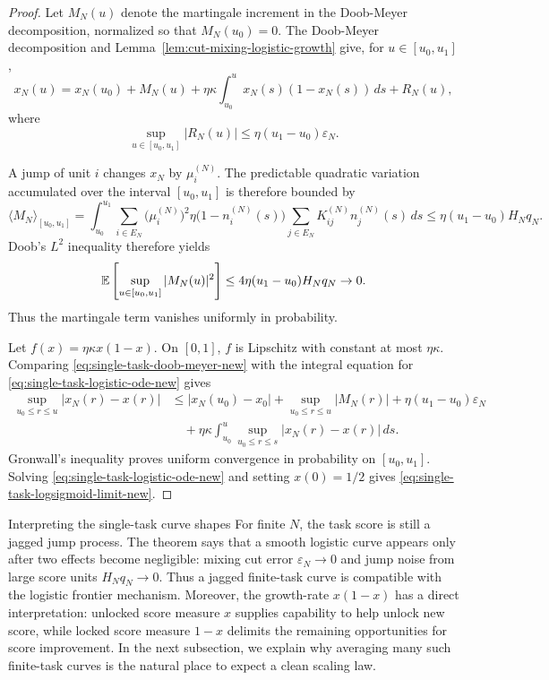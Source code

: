 \begin{proof}
Let $M_N(u)$ denote the martingale increment in the Doob-Meyer decomposition, normalized so that $M_N(u_0)=0$. The Doob-Meyer decomposition and Lemma~\ref{lem:cut-mixing-logistic-growth} give, for $u\in[u_0,u_1]$,
\begin{equation}
    x_N(u)=x_N(u_0)+M_N(u)+\eta\kappa\int_{u_0}^{u}x_N(s)(1-x_N(s))\,ds+R_N(u),
    \label{eq:single-task-doob-meyer-new}
\end{equation}
where
\begin{equation*}
    \sup_{u\in[u_0,u_1]}|R_N(u)|\le \eta(u_1-u_0)\varepsilon_N.
\end{equation*}

A jump of unit $i$ changes $x_N$ by $\mu_i^{(N)}$. The predictable quadratic variation accumulated over the interval $[u_0,u_1]$ is therefore bounded by
\begin{equation*}
    \langle M_N\rangle_{[u_0,u_1]}
    =\int_{u_0}^{u_1}\sum_{i\in E_N}\bigl(\mu_i^{(N)}\bigr)^2
      \eta\bigl(1-n_i^{(N)}(s)\bigr)\sum_{j\in E_N}K_{ij}^{(N)}n_j^{(N)}(s)\,ds
    \le
    \eta(u_1-u_0)H_Nq_N.
\end{equation*}
Doob's $L^2$ inequality therefore yields
\begin{equation*}
    \mathbb{E}\left[\sup_{u\in[u_0,u_1]}|M_N(u)|^2\right]
    \le 4\eta(u_1-u_0)H_Nq_N\to0.
\end{equation*}
Thus the martingale term vanishes uniformly in probability.

Let $f(x)=\eta\kappa x(1-x)$. On $[0,1]$, $f$ is Lipschitz with constant at most $\eta\kappa$. Comparing \eqref{eq:single-task-doob-meyer-new} with the integral equation for \eqref{eq:single-task-logistic-ode-new} gives
\begin{align*}
    \sup_{u_0\le r\le u}|x_N(r)-x(r)|
    &\le |x_N(u_0)-x_0|+
      \sup_{u_0\le r\le u}|M_N(r)|
      +\eta(u_1-u_0)\varepsilon_N  \\
    &\quad+\eta\kappa\int_{u_0}^{u}\sup_{u_0\le r\le s}|x_N(r)-x(r)|\,ds.
\end{align*}
Gronwall's inequality proves uniform convergence in probability on $[u_0,u_1]$. Solving \eqref{eq:single-task-logistic-ode-new} and setting $x(0)=1/2$ gives \eqref{eq:single-task-logsigmoid-limit-new}.
\end{proof}

\begin{readingbox}{Interpreting the single-task curve shapes}
For finite $N$, the task score is still a jagged jump process. The theorem says that a smooth logistic curve appears only after two effects become negligible: mixing cut error $\varepsilon_N \to 0$ and jump noise from large score units \(H_Nq_N \to 0\). Thus a jagged finite-task curve is compatible with the logistic frontier mechanism. Moreover, the growth-rate $x(1-x)$ has a direct interpretation: unlocked score measure $x$ supplies capability to help unlock new score, while locked score measure $1-x$ delimits the remaining opportunities for score improvement. In the next subsection, we explain why averaging many such finite-task curves is the natural place to expect a clean scaling law.
\end{readingbox}


